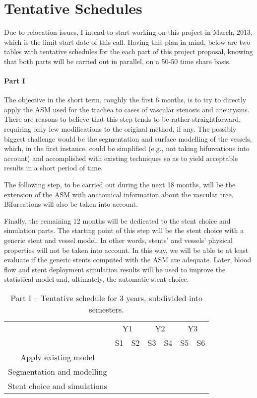 \section{Tentative Schedules}

Due to relocation issues, I intend to start working on this project in March, 2013, which is the limit start date of this call. Having this plan in mind, below are two tables with tentative schedules for the each part of this project proposal, knowing that both parts will be carried out in parallel, on a 50-50 time share basis.

\paragraph{Part I}
The objective in the short term, roughly the first 6 months, is to try to directly apply the ASM used for the trachea to cases of vascular stenosis and aneurysms. There are reasons to believe that this step tends to be rather straightforward, requiring only few modifications to the original method, if any. The possibly biggest challenge would be the segmentation and surface modelling of the vessels, which, in the first instance, could be simplified (e.g., not taking bifurcations into account) and accomplished with existing techniques so as to yield acceptable results in a short period of time. 

The following step, to be carried out during the next 18 months, will be the extension of the ASM with anatomical information about the vascular tree. Bifurcations will also be taken into account. 

Finally, the remaining 12 months will be dedicated to the stent choice and simulation parts. The starting point of this step will be the stent choice with a generic stent and vessel model. In other words, stents' and vessels' physical properties will not be taken into account. In this way, we will be able to at least evaluate if the generic stents computed with the ASM are adequate. Later, blood flow and stent deployment simulation results will be used to improve the statistical model and, ultimately, the automatic stent choice.  

\begin{table}[h]\centering
\begin{tabular}{c|c|c|c|c|c|c|}
\cline{2-7}
 & \multicolumn{2}{|c|}{Y1} & \multicolumn{2}{|c|}{Y2} & \multicolumn{2}{|c|}{Y3} \\ \cline{2-7}
 & S1 & S2 & S3 & S4 & S5 & S6 \\ \hline
\multicolumn{1}{|c|}{Apply existing model} & \cellcolor{green} & & & & & \\ \hline
\multicolumn{1}{|c|}{Segmentation and modelling} & & \cellcolor{green} & \cellcolor{green} & \cellcolor{green} & & \\ \hline
\multicolumn{1}{|c|}{Stent choice and simulations} & & & & & \cellcolor{green} & \cellcolor{green} \\ \hline
\end{tabular}
\caption{Part I -- Tentative schedule for 3 years, subdivided into semesters.}
\label{tab:schedule1}
\end{table}

